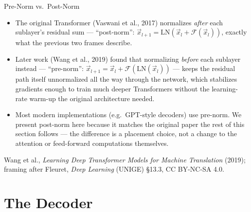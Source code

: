 \begin{vbframe}{Pre-Norm vs.\ Post-Norm}
\begin{itemize}
  \item The original Transformer (Vaswani et al., 2017) normalizes \emph{after} each sublayer's residual sum --- ``post-norm'': $\vec x_{l+1} = \mathrm{LN}(\vec x_l + \mathcal{F}(\vec x_l))$, exactly what the previous two frames describe.
  \item Later work (Wang et al., 2019) found that normalizing \emph{before} each sublayer instead --- ``pre-norm'': $\vec x_{l+1} = \vec x_l + \mathcal{F}(\mathrm{LN}(\vec x_l))$ --- keeps the residual path itself unnormalized all the way through the network, which stabilizes gradients enough to train much deeper Transformers without the learning-rate warm-up the original architecture needed.
  \item Most modern implementations (e.g.\ GPT-style decoders) use pre-norm. We present post-norm here because it matches the original paper the rest of this section follows --- the difference is a placement choice, not a change to the attention or feed-forward computations themselves.
\end{itemize}
{\footnotesize Wang et al., \textit{Learning Deep Transformer Models for Machine Translation} (2019); framing after Fleuret, \textit{Deep Learning} (UNIGE) \S13.3, CC BY-NC-SA 4.0.}
\end{vbframe}


\section{The Decoder}

